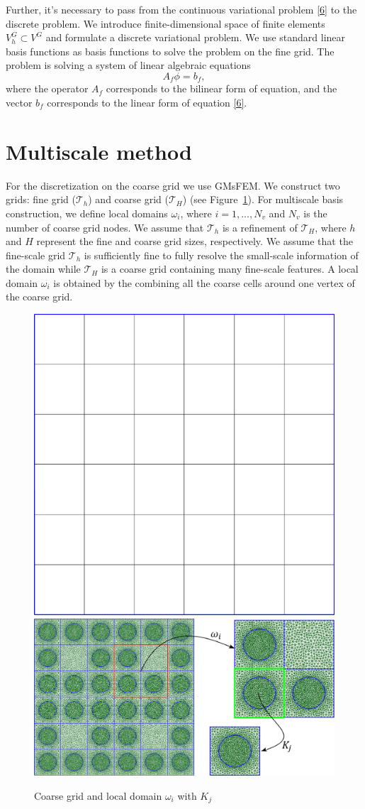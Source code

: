 \documentclass[preprint]{elsarticle}
\begin{document}
Further, it's necessary to pass from the continuous variational problem \eqref{6} to the discrete problem. 
We introduce finite-dimensional space of finite elements $V^G_h \subset V^G$ and formulate a discrete variational problem. 
We use standard linear basis functions as basis functions to solve the problem on the fine grid.
The problem is solving a system of linear algebraic equations
\begin{equation}\label{7}
	A_f \phi = b_f,
\end{equation}
where the operator $A_f$ corresponds to the bilinear form of equation, and the vector $b_f$ corresponds to the linear form of equation \eqref{6}.

\section{Multiscale method}
For the discretization on the coarse grid we use GMsFEM.
We construct two grids: fine grid ($\mathcal{T}_h$) and coarse grid ($\mathcal{T}_H$) (see Figure~\ref{grid}).
For multiscale basis construction, we define local domains $\omega_i$, where $i = 1,..., N_v$ and $N_v$ is the number of coarse grid nodes.
We assume that $\mathcal{T}_h$ is a refinement of $\mathcal{T}_H$, where $h$ and $H$ represent the fine and coarse grid sizes, respectively. 
We assume that the fine-scale grid $\mathcal{T}_h$ is sufficiently fine to fully resolve the small-scale information of the domain  while $\mathcal{T}_H$ is a coarse grid containing many fine-scale features.
A local domain $\omega_i$ is obtained by the combining all the coarse cells around one vertex of the coarse grid. 

\begin{figure}[ht]
	\centering
		\includegraphics[width=0.3\linewidth]{coarse_grid.eps} \hspace{2em}
		\includegraphics[width=0.57\linewidth]{omega.eps} 
	\caption{Coarse grid and local domain $\omega_i$ with $K_j$}
	\label{grid}
\end{figure} 
\end{document}
